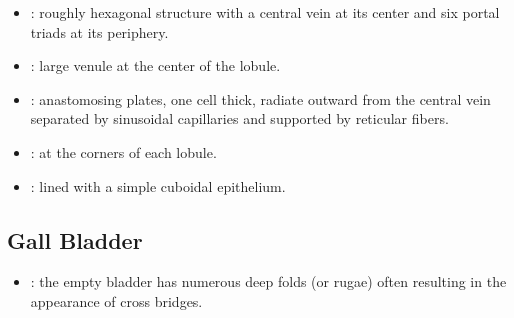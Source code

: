 \begin{itemize}
\begin{multicols}{2}
\begin{itemize}
    \begin{center}
    \end{center}
    
    \item {}: roughly hexagonal structure with a central vein at its center and six portal triads at its periphery.
    
    \begin{center}
    \end{center}
    
    \item {}: large venule at the center of the lobule.
    
    \begin{center}
    \end{center}
    
    \item {}: anastomosing plates, one cell thick, radiate outward from the central vein separated by sinusoidal capillaries and supported by reticular fibers.
    
    \begin{center}
    \end{center}
    
    \item {}: at the corners of each lobule.
    
    \begin{center}
    \end{center}
    
    \item {}: lined with a simple cuboidal epithelium.
    
    \begin{center}
    \end{center}
    
  \end{itemize}
  \end{multicols}
  
  \subsection{Gall Bladder}\label{Gall Bladder}
  \begin{center}
  \end{center}
  \begin{multicols}{2}
  \begin{itemize}
    \item {}: the empty bladder has numerous deep folds (or rugae) often resulting in the appearance of cross bridges.
    

\end{itemize}
\end{multicols}
\end{itemize}

